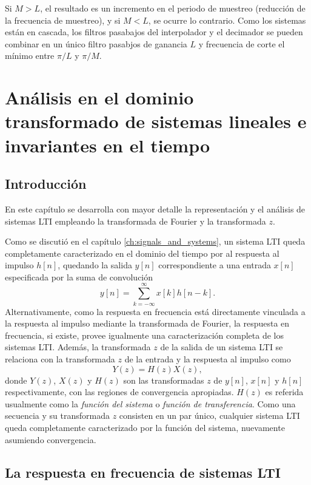 \documentclass[a4paper]{report}
\begin{document}
Si \(M>L\), el resultado es un incremento en el periodo de muestreo (reducción de la frecuencia de muestreo), y si \(M<L\), se ocurre lo contrario. Como los sistemas están en cascada, los filtros pasabajos del interpolador y el decimador se pueden combinar en un único filtro pasabjos de ganancia \(L\) y frecuencia de corte el mínimo entre \(\pi/L\) y \(\pi/M\).




\chapter{Análisis en el dominio transformado de sistemas lineales e invariantes en el tiempo}

\section{Introducción}

En este capítulo se desarrolla con mayor detalle la representación y el análisis de sistemas LTI empleando la transformada de Fourier y la transformada \(z\).

Como se discutió en el capítulo \ref{ch:signals_and_systems}, un sistema LTI queda completamente caracterizado en el dominio del tiempo por al respuesta al impulso \(h[n]\), quedando la salida \(y[n]\) correspondiente a una entrada \(x[n]\) especificada por la suma de convolución
\[
 y[n]=\sum_{k=-\infty}^\infty x[k]h[n-k].
\]
Alternativamente, como la respuesta en frecuencia está directamente vinculada a la respuesta al impulso mediante la transformada de Fourier, la respuesta en frecuencia, si existe, provee igualmente una caracterización completa de los sistemas LTI. Además, la transformada \(z\) de la salida de un sistema LTI se relaciona con la transformada \(z\) de la entrada y la respuesta al impulso como
\begin{equation}\label{eq:transform_analysis_input_output_system_function_lti}
 Y(z)=H(z)X(z), 
\end{equation}
donde \(Y(z)\), \(X(z)\) y \(H(z)\) son las transformadas \(z\) de \(y[n]\), \(x[n]\) y \(h[n]\) respectivamente, con las regiones de convergencia apropiadas. \(H(z)\) es referida usualmente como la \emph{función del sistema} o \emph{función de transferencia}. Como una secuencia y su transformada \(z\) consisten en un par único, cualquier sistema LTI queda completamente caracterizado por la función del sistema, nuevamente asumiendo convergencia.

\section{La respuesta en frecuencia de sistemas LTI}\label{sec:transform_analysis_frequency_response_lti}
\end{document}
